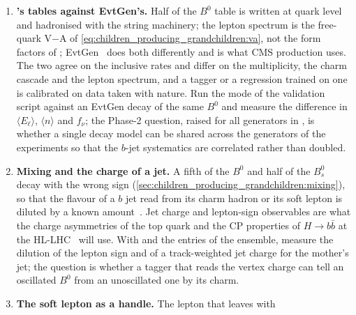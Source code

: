 \begin{enumerate}
    learn the vertex topology from the tracks. All of them are trained on
    simulation, and the simulation's lifetimes~\cite{LHCb:2014qsd,Lenz:2022rbq},
    hadron fractions~\cite{LHCb:2019fns} and charm cascades set the
    distributions of \dzero and \Lxy they learn. With 
    off and the species of the ensemble, measure how the \dzero
    distribution of the tracks shifts when the $B_s^0$ or $\Lambda_b^0$
    fraction is changed, and ask which Phase-2 calibration of the tagger
    \cite{CMS:2017wtu} must carry a decay-model systematic.
  \item \textbf{\PYTHIA's tables against EvtGen's.} Half of the $B^0$
    table is written at quark level and hadronised with the string
    machinery; the lepton spectrum is the free-quark V$-$A of
    \cref{eq:children_producing_grandchildren:va}, not the form factors of
    \cite{Caprini:1997mu,Boyd:1995sq}; EvtGen~\cite{Lange:2001uf,Abudinen:2024wpc}
    does both differently and is what CMS production uses. The two agree
    on the inclusive rates and differ on the multiplicity, the charm
    cascade and the lepton spectrum, and a tagger or a regression trained
    on one is calibrated on data taken with nature. Run the 
    mode of the validation script against an EvtGen decay of the same
    $B^0$ and measure the difference in $\langle E_\ell\rangle$,
    $\langle n\rangle$ and $f_\nu$; the Phase-2 question, raised for all
    generators in \cite{HSFPhysicsEventGeneratorWG:2020gxw}, is whether a
    single decay model can be shared across the generators of the
    experiments so that the $b$-jet systematics are correlated rather than
    doubled.
  \item \textbf{Mixing and the charge of a jet.} A fifth of the $B^0$
    and half of the $B_s^0$ decay with the wrong sign
    (\cref{sec:children_producing_grandchildren:mixing}), so that the
    flavour of a $b$ jet read from its charm hadron or its soft lepton is
    diluted by a known amount~\cite{Artuso:2015swg,LHCb:2021moh}. Jet
    charge and lepton-sign observables are what the charge asymmetries
    of the top quark and the CP properties of $H\to b\bar b$ at the
    HL-LHC~\cite{Azzi:2019yne} will use. With  and the
     entries of the ensemble, measure the dilution of the
    lepton sign and of a track-weighted jet charge for the mother's jet;
    the question is whether a tagger that reads the vertex charge can
    tell an oscillated $B^0$ from an unoscillated one by its charm.
  \item \textbf{The soft lepton as a handle.} The lepton that leaves with

\end{enumerate}
